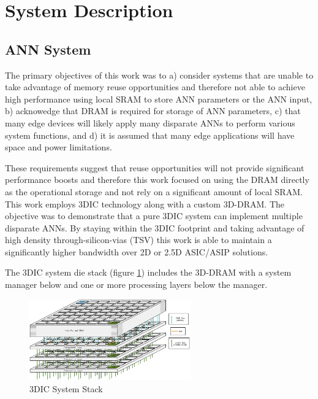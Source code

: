 \documentclass[journal]{IEEEtran}
\begin{document}
\section{System Description}
\label{System Description}

\subsection{ANN System}
\label{sec:ANN System}

The primary objectives of this work was to a) consider systems that are unable to take advantage of memory reuse opportunities and therefore not able to achieve high performance using
local SRAM to store ANN parameters or the ANN input, b) acknowedge that DRAM is required for storage of ANN parameters, c) that many edge devices will likely apply many disparate ANNs
to perform various system functions, and d) it is assumed that many edge applications will have space and power limitations.

These requirements suggest that reuse opportunities will not provide significant performance boosts and therefore this work focused on using the DRAM directly as the operational
storage and not rely on a significant amount of local SRAM.
This work employs 3DIC technology along with a custom 3D-DRAM. The objective was to demonstrate that a pure 3DIC system can implement multiple disparate ANNs. By staying within the 3DIC footprint and taking advantage of high
density through-silicon-vias (TSV) this work is able to maintain a significantly higher bandwidth over 2D or 2.5D ASIC/ASIP solutions.

The 3DIC system die stack (figure \ref{fig:3DICStack}) includes the 3D-DRAM with a system manager below and one or more processing layers below the manager.
\begin{figure}[!t]
\centerline{
\mbox{\includegraphics[width=2.75in]{StackDiagram.jpg}}
}
\caption{3DIC System Stack}
\label{fig:3DICStack}
\end{figure}
\end{document}
